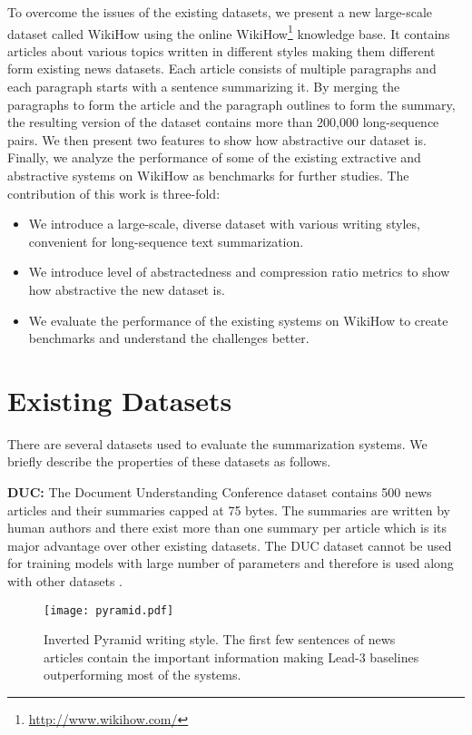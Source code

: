 \documentclass[11pt,a4paper]{article}
\begin{document}
To overcome the issues of the existing datasets, we present a new large-scale dataset called WikiHow using the online WikiHow\footnote{\url{http://www.wikihow.com/}} knowledge base. It contains articles about various topics written in different styles making them different form existing news datasets.
Each article consists of multiple paragraphs and each paragraph starts with a sentence summarizing it. By merging the paragraphs to form the article and the paragraph outlines to form the summary, the resulting version of the dataset contains more than 200,000 long-sequence pairs. 
We then present two features to show how abstractive our dataset is. Finally, we analyze the performance of some of the existing extractive and abstractive systems on WikiHow as benchmarks for further studies.
The contribution of this work is three-fold:
\begin{itemize}
\item We introduce a large-scale, diverse dataset with various writing styles, convenient for long-sequence text summarization.
\item We introduce level of abstractedness and compression ratio metrics to show how abstractive the new dataset is.
\item We evaluate the performance of the existing systems on WikiHow to create benchmarks and understand the challenges better.
\end{itemize}





\section{Existing Datasets}
There are several datasets used to evaluate the summarization systems. We briefly describe the properties of these datasets as follows.

\noindent\textbf{DUC:} The Document Understanding Conference dataset \cite{harman2004effects} contains 500 news articles and their summaries capped at 75 bytes. The summaries are written by human authors and there exist more than one summary per article which is its major advantage over other existing datasets. 
The DUC dataset cannot be used for training models with large number of parameters and therefore is used along with other datasets \cite{rush2015neural,nallapati2017summarunner}. 
\begin{figure}[t]
  \centering    
  \texttt{[image: pyramid.pdf]}
\caption{Inverted Pyramid writing style. The first few sentences of news articles contain the important information making Lead-3 baselines outperforming most of the systems.}
  \label{fig:pyramid}
  \vspace*{-2ex}
\end{figure}
\end{document}
